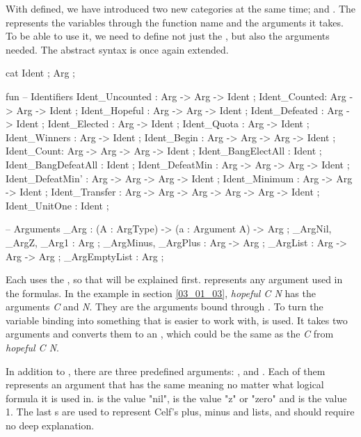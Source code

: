 With  defined, we have introduced two new categories at the same time;  and . The  represents the variables through the function name and the arguments it takes. To be able to use it, we need to define not just the , but also the arguments needed. The abstract syntax is once again extended.

\begin{lstgf}
    cat
        Ident ; Arg ;

    fun
        -- Identifiers
        Ident_Uncounted : Arg -> Arg -> Ident ;
        Ident_Counted: Arg -> Arg -> Ident ;
        Ident_Hopeful : Arg -> Arg -> Ident ;
        Ident_Defeated : Arg -> Ident ;
        Ident_Elected : Arg -> Ident ;
        Ident_Quota : Arg -> Ident ;
        Ident_Winners : Arg -> Ident ;
        Ident_Begin : Arg -> Arg -> Arg -> Ident ;
        Ident_Count: Arg -> Arg -> Arg -> Ident ;
        Ident_BangElectAll : Ident ;
        Ident_BangDefeatAll : Ident ;
        Ident_DefeatMin : Arg -> Arg -> Arg -> Ident ;
        Ident_DefeatMin' : Arg -> Arg -> Arg -> Ident ;
        Ident_Minimum : Arg -> Arg -> Ident ;
        Ident_Transfer : Arg -> Arg -> Arg -> Arg -> Arg -> Ident ;
        Ident_UnitOne : Ident ;

        -- Arguments
        _Arg : (A : ArgType) -> (a : Argument A) -> Arg ;
        _ArgNil, _ArgZ, _Arg1 : Arg ;
        _ArgMinus, _ArgPlus : Arg -> Arg ;
        _ArgList : Arg -> Arg -> Arg ;
        _ArgEmptyList : Arg ;
\end{lstgf}

Each  uses the , so that will be explained first.  represents any argument used in the formulas. In the example in section \ref{03_01_03}, \textit{hopeful C N} has the arguments \textit{C} and \textit{N}. They are the arguments bound through . To turn the variable binding into something that is easier to work with,  is used. It takes two arguments and converts them to an , which could be the same as the \textit{C} from \textit{hopeful C N}. 

In addition to , there are three predefined arguments: ,  and . Each of them represents an argument that has the same meaning no matter what logical formula it is used in.  is the value "nil",  is the value "z" or "zero" and  is the value 1. The last s are used to represent Celf's plus, minus and lists, and should require no deep explanation. 

